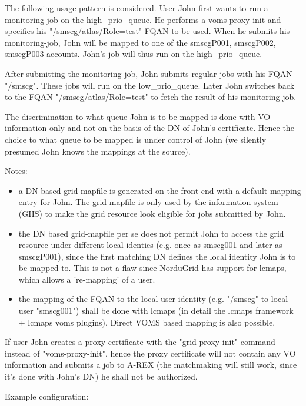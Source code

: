 \documentclass{article}
\begin{document}
The following usage pattern is considered. User John first wants to
run a monitoring job on the high\_prio\_queue. He performs a
voms-proxy-init and specifies his "/smscg/atlas/Role=test" FQAN to be
used. When he submits his monitoring-job, John will be mapped to one
of the smscgP001, smscgP002, smscgP003 accounts. John's job will thus
run on the high\_prio\_queue.

After submitting the monitoring job, John submits regular jobs with
his FQAN "/smscg". These jobs will run on the low\_prio\_queue. Later
John switches back to the FQAN "/smscg/atlas/Role=test" to fetch the
result of his monitoring job.

The discrimination to what queue John is to be mapped is done with VO
information only and not on the basis of the DN of John's
certificate. Hence the choice to what queue to be mapped is under
control of John (we silently presumed John knows the mappings at the
source).

Notes:
\begin{itemize}
\item a DN based grid-mapfile is generated on the front-end with a
  default mapping entry for John. The grid-mapfile is only used by the
  information system (GIIS) to make the grid resource look eligible
  for jobs submitted by John.
\item the DN based grid-mapfile per se does not permit John to access
  the grid resource under different local identies (e.g. once as
  smscg001 and later as smscgP001), since the first matching DN
  defines the local identity John is to be mapped to. This is not a
  flaw since NorduGrid has support for lcmaps, which allows a
  're-mapping' of a user.
\item the mapping of the FQAN to the local user identity
  (e.g. "/smscg" to local user "smscg001") shall be done with lcmaps
  (in detail the lcmaps framework + lcmaps voms plugins). Direct VOMS
  based mapping is also possible.
\end{itemize}

If user John creates a proxy certificate with the "grid-proxy-init"
command instead of "voms-proxy-init", hence the proxy certificate will
not contain any VO information and submits a job to A-REX (the
matchmaking will still work, since it's done with John's DN) he shall
not be authorized.

Example configuration:
\end{document}
